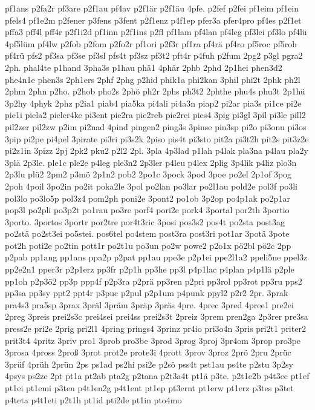 {pf1ans
p2fa2r
pf3are
p2f1au
pf4av
p2f1är
p2f1äu
4pfe.
p2fef
p2fei
pf1eim
pf1ein
pfels4
pf1e2m
p2fener
p3fens
p3fent
p2f1enz
p4f1ep
pfer3a
pfer4pro
pf4es
p2f1et
pffa3
pff4l
pff4r
p2f1i2d
pf1inn
p2f1ins
p2fl
pf1lam
pf4lan
pf4leg
pf3lei
pf3lo
pf4lü
4pf5lüm
pf4lw
p2fob
p2fom
p2fo2r
pf1ori
p2f3r
pf1ra
pf4rä
pf4ro
pf5roc
pf5roh
pf4rü
pfs2
pf3sa
pf3se
pf3sl
pfs4t
pf3sz
pf3t2
pft4r
p4fuh
p2fum
2pg2
p3gl
pgra2
2ph.
phal4te
p1hand
3pha3s
p1hau
phä1
4phär
2phb
2phd
2p1hei
phen3d2
phe4n1e
phen3s
2ph1ers
2phf
2phg
p2hid
phik1a
phi2kan
3phil
phi2t
2phk
ph2l
2phm
2phn
p2ho.
p2hob
pho2s
2phö
ph2r
2phs
ph3t2
2phthe
phu4s
phu3t
2p1hü
3p2hy
4phyk
2phz
p2ia1
piab4
pia5ka
pi4ali
pi4a3n
piap2
pi2ar
pia3s
pi1ce
pi2e
pie1i
piela2
pieler4ke
pi3ent
pie2ra
pie2reb
pie2rei
pies4
3pig
pi3gl
3pil
pi3le
pill2
pil2zer
pil2zw
p2im
pi2nad
4pind
pingen2
ping3s
3pinse
pin3sp
pi2o
pi3onu
pi3os
3pip
pi2pe
pi4pel
3pirate
pi3ri
pi3s2k
2piso
pis4t
pi3sto
pit2a
pi3t2h
pit2s
pit3z2e
pi2z1in
3pizz
2pj
2pk2
pku2
p2l2
2pl.
3pla
4p3lad
p1lah
p4lak
pla3na
p4lau
pla2y
3plä
2p3le.
ple1c
ple2e
p4leg
ple3n2
2p3ler
p4leu
p4lex
2plig
3p4lik
p4liz
plo3n
2p3lu
plü2
2pm2
p3mö
2p1n2
pob2
2po1c
3pock
3pod
3poe
po2el
2p1of
3pog
2poh
4poil
3po2in
po2it
poka2le
3pol
po2lan
po3lar
po2l1au
pold2e
pol3f
po3li
pol3lo
po3lo5p
pol3z4
pom2ph
poni2e
3pont2
po1ob
3p2op
po4p1ak
po2p1ar
pop3l
po2pli
po3p2t
po1rau
po3re
porf4
pori2e
pork4
3portal
por2th
3portio
3porto.
3portos
3portr
por2tre
por4t3ric
3posi
pos3s2
pos4t
po2sta
post3ag
po2stä
po2st3ei
po5stei.
pos6tel
po4stem
post3ra
post3ri
pot1ar
3potä
3pote
pot2h
poti2e
po2tin
pott1r
po2t1u
po3un
po2w
powe2
p2o1x
pö2bl
pö2c
2pp
p2pab
pp1ang
pp1ans
ppa2p
p2pat
pp1au
ppe3e
p2p1ei
ppe2l1a2
ppeli5ne
ppel3z
pp2e2n1
pper3r
p2p1erz
pp3fr
p2p1h
pp3he
pp3l
p4p1lac
p4plan
p4p1lä
p2ple
pp1oh
p2p3ö2
pp3p
ppp4f
p2p3ra
p2prä
pp3ren
p2pri
pp3rol
pp3rot
pp3ru
pps2
pp3sa
pp3sy
ppt2
ppt4r
p3puc
p2pul
p2p1um
p4punk
ppyl2
p2r2
2pr.
3prak
pra4s3
pra5sp
3prax
3präl
3präm
3präp
3präs
4pre.
4prec
3pred
4pree1
pre2ei
2preg
3preis
prei2s3c
prei4sei
prei4ss
prei2s3t
2preiz
3prem
pren2ga
2p3rer
pre3sa
press2e
pri2e
2prig
pri2l1
4pring
prings4
3prinz
pr4io
pri3o4n
3pris
pri2t1
priter2
prit3t4
4pritz
3priv
pro1
3prob
pro3be
3prod
3prog
3proj
3pr4om
3prop
pro3pe
3prosa
4pross
2proß
3prot
prot2e
prote3i
4prott
3prov
3proz
2prö
2pru
2prüc
3prüf
4prüh
2prün
2ps
ps1ad
ps2hi
psi2e
p2sö
pss4t
pst1au
ps4te
p2stu
3p2sy
4psys
ps2ze
2pt
pt1a
pt2ab
pta2g
p2tana
p2t3a4t
pt1ä
p3te.
p2t1e2b
p4t3ec
pt1ef
pt1ei
pt1emi
p3ten
p4t1en2g
p4t1ent
pt1ep
pt3ernt
pt1erw
pt1erz
p3tes
p3tet
p4teta
p4t1eti
p2t1h
pt1id
pti2de
pt1in
pto4mo
}
